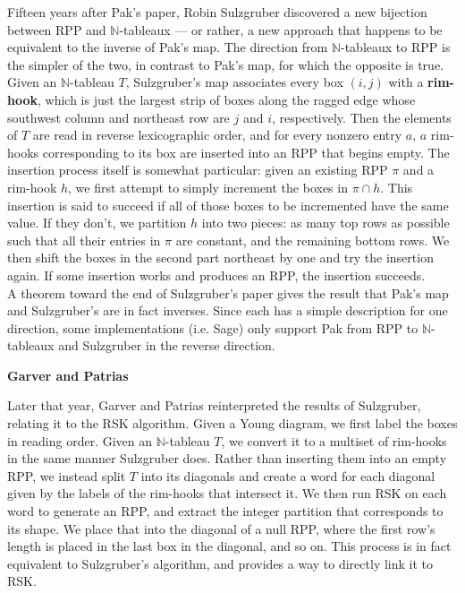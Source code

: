 \normalsize

Fifteen years after Pak's paper, Robin Sulzgruber discovered a new bijection between RPP and $\mathbb{N}$-tableaux --- or rather, a new approach that happens to be equivalent to the inverse of Pak's map. The direction from $\mathbb{N}$-tableaux to RPP is the simpler of the two, in contrast to Pak's map, for which the opposite is true. Given an $\mathbb{N}$-tableau $T$, Sulzgruber's map associates every box $(i, j)$ with a \textbf{rim-hook}, which is just the largest strip of boxes along the ragged edge whose southwest column and northeast row are $j$ and $i$, respectively. Then the elements of $T$ are read in reverse lexicographic order, and for every nonzero entry $a$, $a$ rim-hooks corresponding to its box are inserted into an RPP that begins empty. The insertion process itself is somewhat particular: given an existing RPP $\pi$ and a rim-hook $h$, we first attempt to simply increment the boxes in $\pi \cap h$. This insertion is said to succeed if all of those boxes to be incremented have the same value. If they don't, we partition $h$ into two pieces: as many top rows as possible such that all their entries in $\pi$ are constant, and the remaining bottom rows. We then shift the boxes in the second part northeast by one and try the insertion again. If some insertion works and produces an RPP, the insertion succeeds.\\

A theorem toward the end of Sulzgruber's paper gives the result that Pak's map and Sulzgruber's are in fact inverses. Since each has a simple description for one direction, some implementations (i.e. Sage) only support Pak from RPP to $\mathbb{N}$-tableaux and Sulzgruber in the reverse direction.\\



\vspace{.25in}

\Large \textbf{Garver and Patrias}\\

\normalsize

Later that year, Garver and Patrias reinterpreted the results of Sulzgruber, relating it to the RSK algorithm. Given a Young diagram, we first label the boxes in reading order. Given an $\mathbb{N}$-tableau $T$, we convert it to a multiset of rim-hooks in the same manner Sulzgruber does. Rather than inserting them into an empty RPP, we instead split $T$ into its diagonals and create a word for each diagonal given by the labels of the rim-hooks that intersect it. We then run RSK on each word to generate an RPP, and extract the integer partition that corresponds to its shape. We place that into the diagonal of a null RPP, where the first row's length is placed in the last box in the diagonal, and so on. This process is in fact equivalent to Sulzgruber's algorithm, and provides a way to directly link it to RSK.



